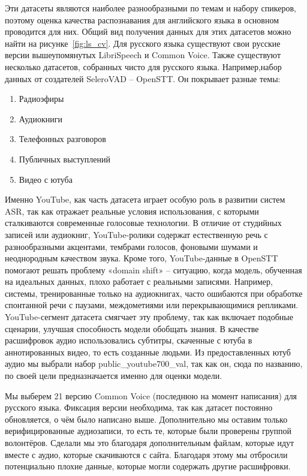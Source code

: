 Эти датасеты являются наиболее разнообразными по темам и набору спикеров, поэтому оценка качества распознавания для английского языка в основном проводится для них.
Общий вид получения данных для этих датасетов можно найти на рисунке~\ref{fig:ls_cv}.
Для русского языка существуют свои русские версии вышеупомянутых LibriSpeech и Common Voice.
Также существуют несколько датасетов, собранных чисто для русского языка. 
Например,набор данных от создателей SeleroVAD -- OpenSTT\cite{andrusenko2020exploration}. 
Он покрывает разные темы: 
\begin{enumerate}
  \item Радиоэфиры
  \item Аудиокниги
  \item Телефонных разговоров
  \item Публичных выступлений
  \item Видео с ютуба
\end{enumerate}
Именно YouTube, как часть датасета играет особую роль в развитии систем ASR, так как отражает реальные условия использования, с которыми сталкиваются современные голосовые технологии.
В отличие от студийных записей или аудиокниг, YouTube-ролики содержат естественную речь с разнообразными акцентами, тембрами голосов, фоновыми шумами и неоднородным качеством звука. 
Кроме того, YouTube-данные в OpenSTT помогают решать проблему «domain shift» -- ситуацию, когда модель, обученная на идеальных данных, плохо работает с реальными записями.
Например, системы, тренированные только на аудиокнигах, часто ошибаются при обработке спонтанной речи с паузами, междометиями или перекрывающимися репликами.
YouTube-сегмент датасета смягчает эту проблему, так как включает подобные сценарии, улучшая способность модели обобщать знания.
В качестве расшифровок аудио использовались субтитры, скаченные с ютуба в аннотированных видео, то есть созданные людьми.
Из предоставленных ютуб аудио мы выбрали набор public\_youtube700\_val, так как он, сюда по названию, по своей цели предназначается именно для оценки модели.

Мы выберем 21 версию Common Voice (последнюю на момент написания) для русского языка.
Фиксация версии необходима, так как датасет постоянно обновляется, о чём было написано выше.
Дополнительно мы оставим только верифицированные аудиозаписи, то есть те, которые были проверены группой волонтёров.
Сделали мы это благодаря дополнительным файлам, которые идут вместе с аудио, которые скачиваются с сайта.
Благодаря этому мы отбросили потенциально плохие данные, которые могли содержать другие расшифровки.

